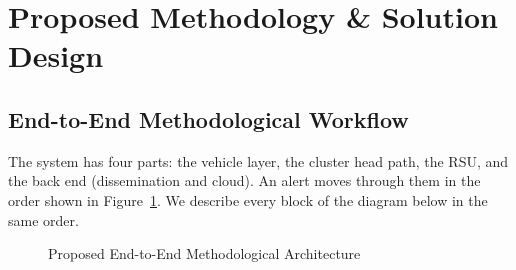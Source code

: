 \documentclass[11pt, a4paper]{article}
\begin{document}
\section{Proposed Methodology \& Solution Design}

\subsection{End-to-End Methodological Workflow}
\noindent
The system has four parts: the vehicle layer, the cluster head path, the RSU, and the back end (dissemination and cloud). An alert moves through them in the order shown in Figure~\ref{fig:arch}. We describe every block of the diagram below in the same order.

\begin{figure}[H]
    \centering
    \caption{Proposed End-to-End Methodological Architecture}
    \label{fig:arch}
\end{figure}
\end{document}
